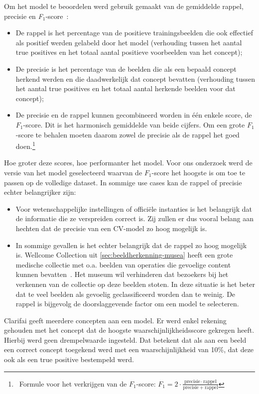 Om het model te beoordelen werd gebruik gemaakt van de gemiddelde rappel, precisie en \textit{F$_{1}$}-score~\autocites{Lievens2017}{Koehrsen2018}:
\begin{itemize}
    \item De rappel is het percentage van de positieve trainingsbeelden die ook effectief als positief werden gelabeld door het model (verhouding tussen het aantal true positives en het totaal aantal positieve voorbeelden van het concept);
    \item De precisie is het percentage van de beelden die als een bepaald concept herkend werden en die daadwerkelijk dat concept bevatten (verhouding tussen het aantal true positives en het totaal aantal herkende beelden voor dat concept);
    \item De precisie en de rappel kunnen gecombineerd worden in één enkele score, de $F_1$-score. Dit is het harmonisch gemiddelde van beide cijfers. Om een grote $F_1$-score te behalen moeten daarom zowel de precisie als de rappel het goed doen.\footnote{~Formule voor het verkrijgen van de $F_1$-score: $F_1 = 2 \cdot \frac{\mathrm{precisie} \cdot \mathrm{rappel}}{\mathrm{precisie} + \mathrm{rappel}}$}
\end{itemize}


Hoe groter deze scores, hoe performanter het model. Voor ons onderzoek werd de versie van het model geselecteerd waarvan de $F_1$-score het hoogste is om toe te passen op de volledige dataset. In sommige use cases kan de rappel of precisie echter belangrijker zijn:
\begin{itemize}
	\item Voor wetenschappelijke instellingen of officiële instanties is het belangrijk dat de informatie die ze verspreiden correct is. Zij zullen er dus vooral belang aan hechten dat de precisie van een CV-model zo hoog mogelijk is. 
	\item In sommige gevallen is het echter belangrijk dat de rappel zo hoog mogelijk is. Wellcome Collection uit \ref{sec:beeldherkenning-musea} heeft een grote medische collectie met o.a. beelden van operaties die gevoelige content kunnen bevatten~\autocite{Pim2018}. Het museum wil verhinderen dat bezoekers bij het verkennen van de collectie op deze beelden stoten. In deze situatie is het beter dat te veel beelden als gevoelig geclassificeerd worden dan te weinig. De rappel is bijgevolg de doorslaggevende factor om een model te selecteren.
\end{itemize}

Clarifai geeft meerdere concepten aan een model. Er werd enkel rekening gehouden met het concept dat de hoogste waarschijnlijkheidsscore gekregen heeft. Hierbij werd geen drempelwaarde ingesteld. Dat betekent dat als aan een beeld een correct concept toegekend werd met een waarschijnlijkheid van 10\%, dat deze ook als een true positive bestempeld werd. 